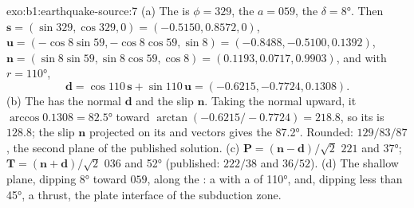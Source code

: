 \begin{solution}{exo:b1:earthquake-source:7}
(a) The  is $\phi = 329$, the  $a = 059$, the  $\delta =
\ang{8}$. Then $\mathbf s = (\sin329, \cos329, 0) = (-0.5150, 0.8572, 0)$,
$\mathbf u = (-\cos8\sin59, -\cos8\cos59, \sin8) = (-0.8488, -0.5100, 0.1392)$,
$\mathbf n = (\sin8\sin59, \sin8\cos59, \cos8) = (0.1193, 0.0717, 0.9903)$,
and with $r = \ang{110}$,
\[
  \mathbf d = \cos110\,\mathbf s + \sin110\,\mathbf u = (-0.6215, -0.7724, 0.1308) .
\]
(b) The  has the normal $\mathbf d$ and the slip $\mathbf n$.
Taking the normal upward, it  $\arccos 0.1308 = \ang{82.5}$ toward
$\arctan(-0.6215/-0.7724) = 218.8$, so its  is $128.8$; the slip
$\mathbf n$ projected on its  and  vectors gives the 
\ang{87.2}. Rounded: $129/83/87$, the second plane of the published solution.
(c) $\mathbf P = (\mathbf n - \mathbf d)/\sqrt2$  $221$ and 
\ang{37}; $\mathbf T = (\mathbf n + \mathbf d)/\sqrt2$  $036$ and 
\ang{52} (published: $222/38$ and $36/52$). (d) The shallow plane, dipping
\ang{8} toward $059$, along the : a  with a 
of \ang{110}, and, dipping less than \ang{45}, a thrust, the plate interface of
the subduction zone.
\end{solution}

